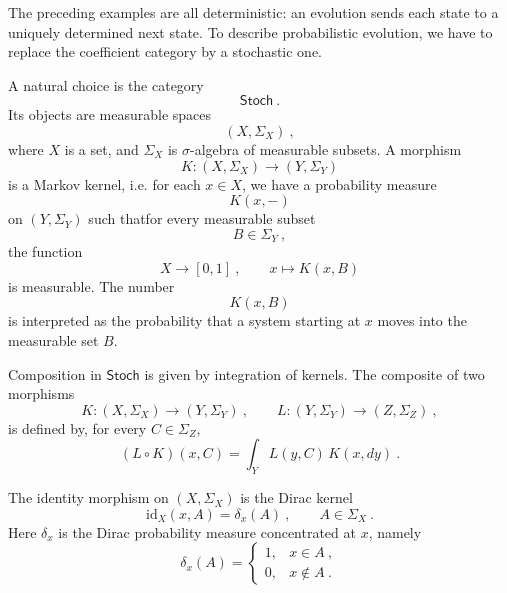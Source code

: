 \documentclass[a4paper,reqno,oneside]{amsart}
\theoremstyle{definition}
\theoremstyle{remark}
\renewcommand{\Sigma}{\varSigma}
\newcommand{\id}{\mathrm{id}}
\numberwithin{equation}{section}
\begin{document}
	The preceding examples are all deterministic: an evolution sends each state to a
	uniquely determined next state. To describe probabilistic evolution, we have to replace the coefficient category by a stochastic one.
	
	A natural choice is the category
	\begin{equation}
		\mathsf{Stoch} \ .
	\end{equation}
	Its objects are measurable spaces
	\begin{equation}
		(X,\Sigma_X) \ ,
	\end{equation}
	where $X$ is a set, and $\Sigma_X$ is $\sigma$-algebra of measurable subsets. A morphism
	\begin{equation}
		K\colon (X,\Sigma_X)\longrightarrow (Y,\Sigma_Y)
	\end{equation}
	is a Markov kernel, i.e. for each
	$x\in X$, we have a probability measure
	\begin{equation}
		K(x,-)
	\end{equation}
	on $(Y,\Sigma_Y)$ such thatfor every measurable subset
	\begin{equation}
		B\in\Sigma_Y \ ,
	\end{equation}
	the function
	\begin{equation}
		X\longrightarrow [0,1] \ ,
		\qquad
		x\longmapsto K(x,B)
	\end{equation}
	is measurable. The number
	\begin{equation}
		K(x,B)
	\end{equation}
	is interpreted as the probability that a system starting at $x$ moves into
	the measurable set $B$.
	
	Composition in $\mathsf{Stoch}$ is given by integration of kernels. The composite of two morphisms
	\begin{equation}
		K\colon (X, \Sigma_X)\longrightarrow (Y,\Sigma_Y) \ , \qquad  L\colon (Y,\Sigma_Y) \longrightarrow (Z,\Sigma_Z) \ ,
	\end{equation}
	is defined by, for every $ C\in\Sigma_Z$,
	\begin{equation}
		(L\circ K)(x,C)
		=
		\int_Y L(y,C)\,K(x,dy) \ .
	\end{equation}
	
	The identity morphism on $(X,\Sigma_X)$ is the Dirac kernel
	\begin{equation}
		\id_X(x,A)=\delta_x(A) \ ,
		\qquad A\in\Sigma_X \ .
	\end{equation}
	Here $\delta_x$ is the Dirac probability measure concentrated at $x$, namely
	\begin{equation}
		\delta_x(A)
		=
		\begin{cases}
			1, & x\in A \ ,\\
			0, & x\notin A \ .
		\end{cases}
	\end{equation}
	
\end{document}

